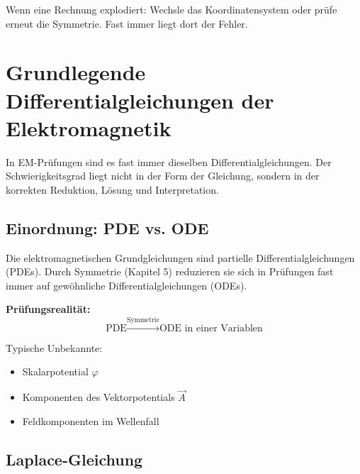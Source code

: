 \documentclass[a4paper]{article}
\newcommand{\imp}[1]{{\color{accent}\bfseries #1}}
\newcommand{\A}{\vec A}
\begin{document}
\begin{taktik}
Wenn eine Rechnung explodiert:
Wechsle das Koordinatensystem oder prüfe erneut die Symmetrie.
Fast immer liegt dort der Fehler.
\end{taktik}

\section{Grundlegende Differentialgleichungen der Elektromagnetik}

\begin{merke}
In EM-Prüfungen sind es fast immer dieselben Differentialgleichungen.
Der Schwierigkeitsgrad liegt nicht in der Form der Gleichung,
sondern in der korrekten Reduktion, Lösung und Interpretation.
\end{merke}

\subsection{Einordnung: PDE vs. ODE}

Die elektromagnetischen Grundgleichungen sind partielle Differentialgleichungen (PDEs).
Durch Symmetrie (Kapitel 5) reduzieren sie sich in Prüfungen fast immer auf
gewöhnliche Differentialgleichungen (ODEs).

\begin{schema}
\imp{Prüfungsrealität:}
\[
\text{PDE} \xrightarrow{\text{Symmetrie}} \text{ODE in einer Variablen}
\]
\end{schema}

Typische Unbekannte:
\begin{itemize}
  \item Skalarpotential $\varphi$
  \item Komponenten des Vektorpotentials $\A$
  \item Feldkomponenten im Wellenfall
\end{itemize}

\subsection{Laplace-Gleichung}
\end{document}
